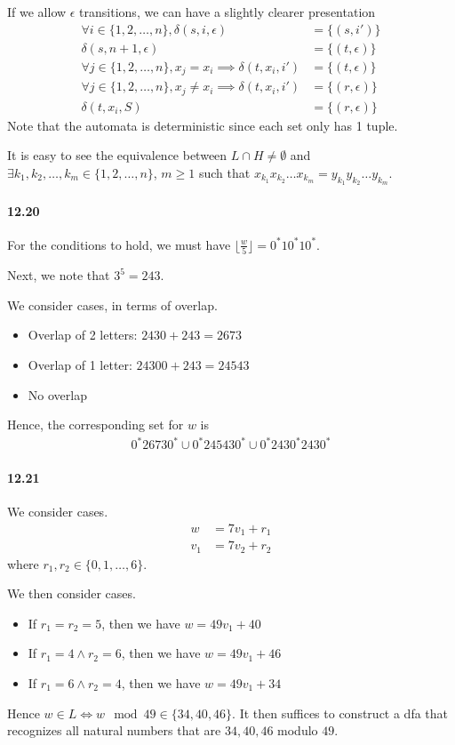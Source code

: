 \documentclass{article}
\begin{document}
If we allow $\epsilon$ transitions, we can have a slightly clearer presentation
\begin{align*}
	\forall i\in \{1,2,\dots, n\}, \delta(s, i, \epsilon) &= \{(s,i')\}\\
	\delta(s,n+1,\epsilon) &= \{(t,\epsilon)\}\\
	\forall j\in \{1,2,\dots, n\}, x_j=x_i\implies \delta(t,x_i,i') &= \{(t,\epsilon)\}\\
	\forall j\in \{1,2,\dots, n\}, x_j\neq x_i\implies \delta(t,x_i,i') &= \{(r,\epsilon)\}\\
	\delta(t,x_i,S) &= \{(r,\epsilon)\}
\end{align*}
Note that the automata is deterministic since each set only has 1 tuple.

It is easy to see the equivalence between $L\cap H\neq \emptyset$ and $\exists k_1,k_2,\dots, k_m\in \{1,2,\dots,n\}$, $m\geq 1$ such that $x_{k_1}x_{k_2}\dots x_{k_m} = y_{k_1}y_{k_2}\dots y_{k_m}$.

\paragraph{12.20} For the conditions to hold, we must have $\lfloor \frac{w}{5} \rfloor = 0^*10^*10^*$.

Next, we note that $3^5=243$.

We consider cases, in terms of overlap.
\begin{itemize}
	\item Overlap of 2 letters: $2430+243 = 2673$
	\item Overlap of 1 letter: $24300+243 = 24543$
	\item No overlap
\end{itemize}

Hence, the corresponding set for $w$ is
\begin{align*}
	0^*26730^* \cup 0^*245430^* \cup 0^*2430^*2430^*
\end{align*}

\paragraph{12.21} We consider cases.
\begin{align*}
	w &= 7v_1 + r_1\\
	v_1 &= 7v_2 + r_2
\end{align*}
where $r_1,r_2\in \{0,1,\dots, 6\}$.

We then consider cases.
\begin{itemize}
	\item If $r_1=r_2=5$, then we have $w=49v_1 + 40$
	\item If $r_1=4\land r_2=6$, then we have $w=49v_1 + 46$
	\item If $r_1=6\land r_2=4$, then we have $w=49v_1 + 34$
\end{itemize}
Hence $w\in L\iff w \mod 49\in \{34, 40, 46\}$. It then suffices to construct a dfa that recognizes all natural numbers that are $34,40,46$ modulo $49$.
\end{document}
